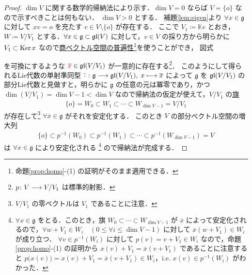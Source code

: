 \documentclass[rep_main]{subfiles}
\begin{document}
\begin{proof}
    $\dim V$ に関する数学的帰納法により示す．$\dim V = 0$ ならば $V = \{o\}$ なので示すべきことは何もない．
    $\dim V > 0$ とする．
    補題\ref{lem:eigen}より $\forall x \in \mathfrak{g}$ に対して $x v = o$ を充たす $v \in V \setminus \{o\}$ が存在する．
    ここで $V_1 \coloneqq \mathbb{K} v$ とおき，$W \coloneqq V / V_1$ とする．$\forall x \in \mathfrak{g} \subset \mathfrak{gl} (V)$ に対して，$v \in V$ の採り方から明らかに $V_1 \subset \operatorname{Ker} x$ なので\hyperref[prop:homo]{商ベクトル空間の普遍性}\footnote{命題\ref{prop:homo}-(1) の証明がそのまま適用できる．}を使うことができ，
    図式
    \begin{center}
    \end{center}
    を可換にするような $\textcolor{red}{\overline{x}} \in \mathfrak{gl}(V/V_1)$ が一意的に存在する\footnote{$p \colon V \longrightarrow V/V_1$ は標準的射影．}．
    このようにして得られるLie代数の単射準同型 $\overline{\cdot}\; \colon \mathfrak{g} \longrightarrow \mathfrak{gl}(V/V_1),\; x \longmapsto \overline{x}$ によって $\mathfrak{g}$ を $\mathfrak{gl} (V/V_1)$ の部分Lie代数と見做すと，明らかに $\mathfrak{g}$ の任意の元は冪零であり，かつ $\dim (V/V_1) = \dim V - 1 < \dim V$ なので帰納法の仮定が使えて，$V/V_1$ の\hyperref[def:flag]{旗}
    \begin{align}
        \{o\} = W_0 \subset W_1 \subset \cdots \subset W_{\dim V - 1} = V/V_1
    \end{align}
    が存在して\footnote{$V/V_1$ の零ベクトルは $V_1$ であることに注意．} $\forall \overline{x} \in \mathfrak{g}$ がそれを安定化する．
    このとき $V$ の部分ベクトル空間の増大列
    \begin{align}
        \{o\} \subset p^{-1} (W_0) \subset p^{-1}(W_1) \subset \cdots \subset p^{-1}(W_{\dim V - 1}) = V
    \end{align}
    は $\forall x \in \mathfrak{g}$ により安定化される
    \footnote{
        $\forall x \in \mathfrak{g}$ をとる．このとき，旗 $W_0 \subset \cdots \subset W_{\dim V -1}$ が $\overline{x}$ によって安定化されるので，$\forall w + V_1 \in W_i\quad (0 \le \forall i \le \dim V - 1)$ に対して $\overline{x}(w + V_1) \in W_i$ が成り立つ．
        $\forall v \in p^{-1}(W_i)$ に対して $p(v) = v + V_1 \in W_i$ なので，命題\ref{prop:homo}-(1) の証明から $x(v) + V_1 = \overline{x}(v + V_1)$ であることに注意すると $p\bigl(x(v)\bigr) = x(v) + V_1 = \overline{x}(v + V_1) \in W_i$，i.e. $x(v) \in p^{-1}(W_i)$ がわかった．
    }
    ので帰納法が完成する．
\end{proof}
\end{document}
